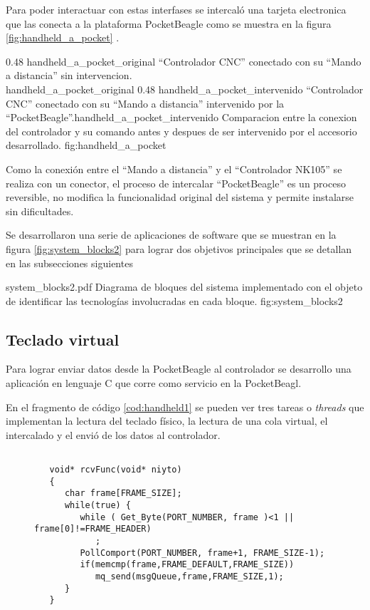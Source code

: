    Para poder interactuar con estas interfases se intercaló una tarjeta electronica que las conecta a la plataforma PocketBeagle como se muestra en la figura \ref{fig:handheld_a_pocket} .\par

\subfigab 
{0.48} {handheld_a_pocket_original} { ``Controlador CNC'' conectado con su ``Mando a distancia'' sin intervencion.\\ \vphantom{1}}{handheld_a_pocket_original}
{0.48} {handheld_a_pocket_intervenido} {``Controlador CNC'' conectado con su ``Mando a distancia'' intervenido por la\\ ``PocketBeagle''.}{handheld_a_pocket_intervenido}
   {Comparacion entre la conexion del controlador y su comando antes y despues de ser intervenido por el accesorio desarrollado.}
   {fig:handheld_a_pocket}

         Como la conexión entre el ``Mando a distancia'' y el ``Controlador NK105'' se realiza con un conector, el proceso de intercalar ``PocketBeagle'' es un proceso reversible, no modifica la funcionalidad original del sistema y permite instalarse sin dificultades.\par

   Se desarrollaron una serie de aplicaciones de software que se muestran en la figura \ref{fig:system_blocks2} para lograr dos objetivos principales que se detallan en las subsecciones siguientes

         {system_blocks2.pdf}
         {Diagrama de bloques del sistema implementado con el objeto de identificar las tecnologías involucradas en cada bloque.}
         {fig:system_blocks2}

\subsection{Teclado virtual}

      Para lograr enviar datos desde la PocketBeagle al controlador se desarrollo una aplicación en lenguaje C que corre como servicio en la PocketBeagl.\par
      En el fragmento de código \ref{cod:handheld1} se pueden ver tres tareas o \textit{threads} que implementan la lectura del teclado físico, la lectura de una cola virtual, el intercalado y el envió de los datos al controlador.\par

\begin{figure}
   \begin{lstlisting}[label={cod:handheld1},caption={Tarea encargada de procesar los datos del teclado fisico y reenviarlos a la cola de multiplexado.}]

   void* rcvFunc(void* niyto)
   {
      char frame[FRAME_SIZE];
      while(true) {
         while ( Get_Byte(PORT_NUMBER, frame )<1 || frame[0]!=FRAME_HEADER)
            ;
         PollComport(PORT_NUMBER, frame+1, FRAME_SIZE-1);
         if(memcmp(frame,FRAME_DEFAULT,FRAME_SIZE))
            mq_send(msgQueue,frame,FRAME_SIZE,1);
      }
   }
   \end{lstlisting}
\end{figure}

